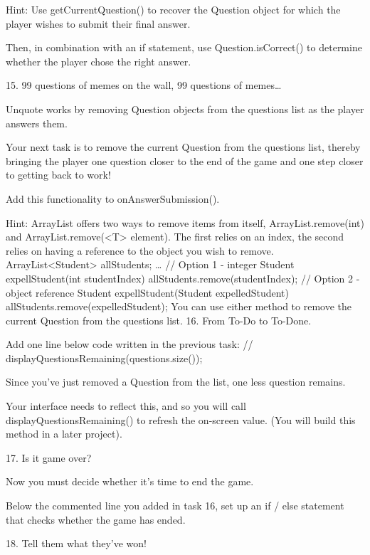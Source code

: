         Hint: Use getCurrentQuestion() to recover the Question object for which the player wishes to submit their final answer.

        Then, in combination with an if statement, use Question.isCorrect() to determine whether the player chose the right answer.

    15.
    99 questions of memes on the wall, 99 questions of memes…

    Unquote works by removing Question objects from the questions list as the player answers them.

    Your next task is to remove the current Question from the questions list, thereby bringing the player one question closer to the end of the game and one step closer to getting back to work!

    Add this functionality to onAnswerSubmission().

        Hint: ArrayList offers two ways to remove items from itself, ArrayList.remove(int) and ArrayList.remove(<T> element). The first relies on an index, the second relies on having a reference to the object you wish to remove.
                ArrayList<Student> allStudents;        
                …
                // Option 1 - integer
                Student expellStudent(int studentIndex) {
                    allStudents.remove(studentIndex);
                }
                // Option 2 - object reference
                Student expellStudent(Student expelledStudent) {
                    allStudents.remove(expelledStudent);
                }
        You can use either method to remove the current Question from the questions list.
    16.
    From To-Do to To-Done.

    Add one line below code written in the previous task:
        // displayQuestionsRemaining(questions.size());

    Since you’ve just removed a Question from the list, one less question remains.

    Your interface needs to reflect this, and so you will call displayQuestionsRemaining() to refresh the on-screen value. (You will build this method in a later project).

    17.
    Is it game over?

    Now you must decide whether it’s time to end the game.

    Below the commented line you added in task 16, set up an if / else statement that checks whether the game has ended.

    18.
    Tell them what they’ve won!

